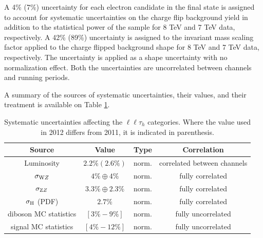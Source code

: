 A 4\% (7\%) uncertainty for each electron candidate in the final state is assigned to account for systematic uncertainties on the charge flip background yield in addition to the statistical power of the sample for 8 TeV and 7 TeV data, respectively. A 42\% (89\%) uncertainty is assigned to the invariant mass scaling factor applied to the charge flipped background shape for 8 TeV and 7 TeV data, respectively. The uncertainty is applied as a shape uncertainty with no normalization effect. Both the uncertainties are uncorrelated between channels and running periods. 

A summary of the sources of systematic uncertainties, their values, and their treatment is available on Table \ref{tab:systematics}.

\begin{table}
  \begin{center}
    \caption{Systematic uncertainties affecting the $\ell\ell\tau_h$ categories.  Where the value used in 2012 differs from 2011, it is indicated in parenthesis.}
    \label{tab:systematics}
    \begin{tabular}{c c c c}
      \hline
      Source                  & Value & Type & Correlation\\
      \hline
      Luminosity              & $2.2\% (2.6\%)$ & norm. & correlated between channels \\
      $\sigma_{\rm WZ}$        & $4\% \oplus 4\%$  & norm. & fully correlated\\
      $\sigma_{\rm ZZ}$        & $3.3\% \oplus 2.3\%$   & norm. & fully correlated\\
      $\sigma_{\rm H}$ (PDF)   & $2.7\%$  & norm. & fully correlated \\
      diboson MC statistics & $[3\% - 9\%]$ & norm. & fully uncorrelated \\
      signal MC statistics & $[4\% - 12\%]$ & norm. & fully uncorrelated \\

\end{tabular}
\end{center}
\end{table}
